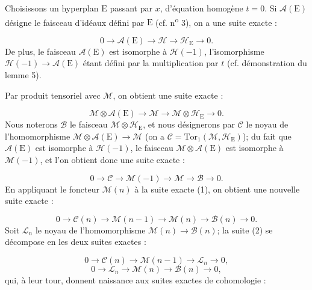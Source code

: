 Choisissons un hyperplan $\mathrm{E}$ passant par $x$, d'équation homogène $t = 0$. Si $\mathcal{A}(\mathrm{E})$ désigne le faisceau d'idéaux défini par $\mathrm{E}$ (cf. n\textsuperscript{o} 3), on a une suite exacte :

\begin{equation*}
0 \to \mathcal{A}(\mathrm{E}) \to \mathcal{H} \to \mathcal{H}_\mathrm{E} \to 0.
\end{equation*}
De plus, le faisceau $\mathcal{A}(\mathrm{E})$ est isomorphe à $\mathcal{H}(-1)$, l'isomorphisme $\mathcal{H}(-1) \to \mathcal{A}(\mathrm{E})$ étant défini par la multiplication par $t$ (cf. démonstration du lemme 5).

Par produit tensoriel avec $\mathcal{M}$, on obtient une suite exacte :

\begin{equation*}
\mathcal{M} \otimes \mathcal{A}(\mathrm{E}) \to \mathcal{M} \to \mathcal{M} \otimes \mathcal{H}_\mathrm{E} \to 0.
\end{equation*}
Nous noterons $\mathcal{B}$ le faisceau $\mathcal{M} \otimes \mathcal{H}_\mathrm{E}$, et nous désignerons par $\mathcal{C}$ le noyau de l'homomorphisme $\mathcal{M} \otimes \mathcal{A}(\mathrm{E}) \to \mathcal{M}$ (on a $\mathcal{C} = \mathrm{Tor}_1(\mathcal{M}, \mathcal{H}_\mathrm{E})$); du fait que $\mathcal{A}(\mathrm{E})$ est isomorphe à $\mathcal{H}(-1)$, le faisceau $\mathcal{M} \otimes \mathcal{A}(\mathrm{E})$ est isomorphe à $\mathcal{M}(-1)$, et l'on obtient donc une suite exacte :

\begin{equation*}\tag{1}
0 \to \mathcal{C} \to \mathcal{M}(-1) \to \mathcal{M} \to \mathcal{B} \to 0.
\end{equation*}
En appliquant le foncteur $\mathcal{M}(n)$ à la suite exacte (1), on obtient une nouvelle suite exacte :

\begin{equation}\tag{2}
0 \to \mathcal{C}(n) \to \mathcal{M}(n-1) \to \mathcal{M}(n) \to \mathcal{B}(n) \to 0.
\end{equation}
Soit $\mathcal{L}_n$ le noyau de l'homomorphisme $\mathcal{M}(n) \to \mathcal{B}(n)$; la suite (2) se décompose en les deux suites exactes :

\begin{equation}\tag{3}
0 \to \mathcal{C}(n) \to \mathcal{M}(n-1) \to \mathcal{L}_n \to 0,
\end{equation}
\begin{equation}\tag{4}
0 \to \mathcal{L}_n \to \mathcal{M}(n) \to \mathcal{B}(n) \to 0,
\end{equation}
qui, à leur tour, donnent naissance aux suites exactes de cohomologie :

